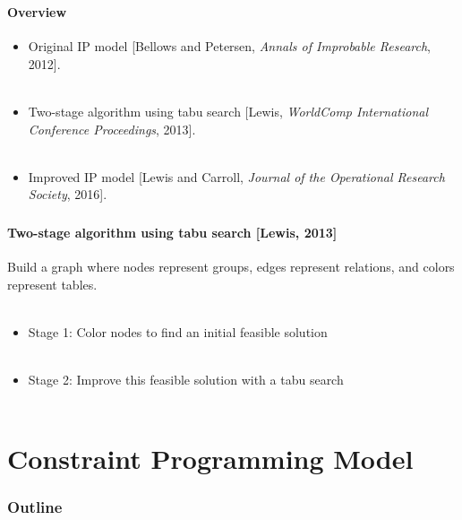 \documentclass{beamer}
\newcommand{\AutoSectionTitle}{}
\begin{document}
\begin{frame}
  \frametitle{\AutoSectionTitle}
  \framesubtitle{Overview}
  \begin{itemize}
  \item Original IP model [Bellows and Petersen, \emph{Annals of Improbable Research}, 2012]. \\~\\
  \item Two-stage algorithm using tabu search [Lewis, \emph{WorldComp International Conference Proceedings}, 2013]. \\~\\
  \item Improved IP model [Lewis and Carroll, \emph{Journal of the Operational Research Society}, 2016].
  \end{itemize}
\end{frame}




\begin{frame}
  \frametitle{\AutoSectionTitle}
  \framesubtitle{Two-stage algorithm using tabu search [Lewis, 2013]}
  Build a graph where nodes represent groups, edges represent relations, and colors represent tables. \\~\\
  \pause
  \begin{itemize}
  \item Stage 1: Color nodes to find an initial feasible solution \\~\\
    \pause
  \item Stage 2: Improve this feasible solution with a tabu search \\~\\
  \end{itemize}
\end{frame}




\renewcommand{\AutoSectionTitle}{Constraint Programming Model}

\section{\AutoSectionTitle}

\begin{frame}
  \frametitle{Outline}
  \tableofcontents[currentsection]
\end{frame}
\end{document}
